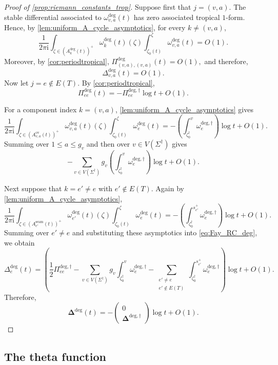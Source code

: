\documentclass[12pt]{amsart}
\numberwithin{equation}{section}
\theoremstyle{definition}
\def\vertices{V}
\def\edges{E}
\def\trop{\dagger}
\def\imunit{{\mathrm{i}}}
\def\vecRC{\bm{\Delta}}
\def\RC{{\Delta}}
\def\ptSig{\zeta}
\def\basept{{\ptSig_0}}
\def\baseptT{{\ptSig_0^\trop}}
\def\mcurve{\Sigma}
\def\tropmcurve{\mcurve^\trop}
\begin{document}
\begin{proof}[Proof of \cref{prop:riemann_constants_trop}]
Suppose first that
$
j=(v,a).
$
The stable differential associated to
$\omega_{v,a}^{\mathrm{deg}}(t)$ has zero associated tropical $1$-form.
Hence, by \cref{lem:uniform_A_cycle_asymptotics}, for every
$k\neq(v,a)$,
\[
\frac{1}{2\pi\imunit}
\int_{\zeta\in(A_k^{\mathrm{deg}}(t))^+}
\omega_k^{\mathrm{deg}}(t)(\zeta)
\int_{\basept(t)}^\zeta
\omega_{v,a}^{\mathrm{deg}}(t)
=
O(1).
\]
Moreover, by \cref{cor:periodtropical},
$
\Pi_{(v,a),(v,a)}^{\mathrm{deg}}(t)
=
O(1),
$
and therefore,
\[
\RC_{v,a}^{\mathrm{deg}}(t)
=
O(1).
\]
Now let
$
j=e\notin\edges(T).
$
By \cref{cor:periodtropical},
\[
\Pi_{ee}^{\mathrm{deg}}(t)
=
-
\Pi_{ee}^{\mathrm{deg},\trop}
\log t
+
O(1).
\]

For a component index $k=(v,a)$,
\cref{lem:uniform_A_cycle_asymptotics} gives
\[
\frac{1}{2\pi\imunit}
\int_{\zeta\in(A_{v,a}^{\mathrm{ov}}(t))^+}
\omega_{v,a}^{\mathrm{deg}}(t)(\zeta)
\int_{\basept(t)}^\zeta
\omega_e^{\mathrm{deg}}(t)
=
-
\left(
\int_{\baseptT}^{v}
\omega_e^{\mathrm{deg},\trop}
\right)
\log t
+
O(1).
\]
Summing over $1\leq a\leq g_v$ and then over
$v\in\vertices(\tropmcurve)$ gives
\[
-
\sum_{v\in\vertices(\tropmcurve)}
g_v
\left(
\int_{\baseptT}^{v}
\omega_e^{\mathrm{deg},\trop}
\right)
\log t
+
O(1).
\]

Next suppose that
$
k=e'\neq e$ with $e'\notin\edges(T).
$
Again by \cref{lem:uniform_A_cycle_asymptotics},
\[
\frac{1}{2\pi\imunit}
\int_{\zeta\in(A_{e'}^{\mathrm{seam}}(t))^+}
\omega_{e'}^{\mathrm{deg}}(t)(\zeta)
\int_{\basept(t)}^\zeta
\omega_e^{\mathrm{deg}}(t)
=
-
\left(
\int_{\baseptT}^{s_{e'}^+}
\omega_e^{\mathrm{deg},\trop}
\right)
\log t
+
O(1).
\]
Summing over $e'\neq e$ and substituting these asymptotics into
\eqref{eq:Fay_RC_deg}, we obtain
\[
\RC_e^{\mathrm{deg}}(t)
=
\left(
\frac12\Pi_{ee}^{\mathrm{deg},\trop}
-
\sum_{v\in\vertices(\tropmcurve)}
g_v
\int_{\baseptT}^{v}
\omega_e^{\mathrm{deg},\trop}
-
\sum_{\substack{
e'\neq e\\
e'\notin\edges(T)
}}
\int_{\baseptT}^{s_{e'}^+}
\omega_e^{\mathrm{deg},\trop}
\right)
\log t
+
O(1).
\]
Therefore,
\[
\vecRC^{\mathrm{deg}}(t)
=
-
\begin{pmatrix}
0\\
\vecRC^{\mathrm{deg},\trop}
\end{pmatrix}
\log t
+
O(1).
\]
\end{proof}




\subsection{The theta function}
\label{sec:break_divisor}
\end{document}
